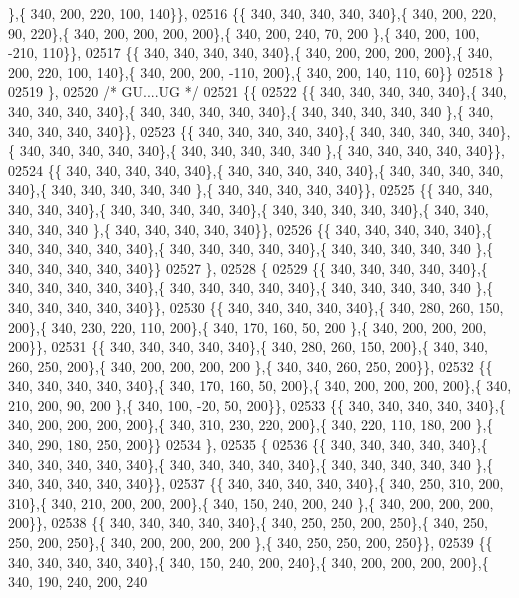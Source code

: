 \begin{DoxyCode}
      \},\{ 340, 200, 220, 100, 140\}\},
02516 \{\{ 340, 340, 340, 340, 340\},\{ 340, 200, 220,  90, 220\},\{ 340, 200, 200, 200, 200\},\{ 340, 200, 240,  70, 200
      \},\{ 340, 200, 100, -210, 110\}\},
02517 \{\{ 340, 340, 340, 340, 340\},\{ 340, 200, 200, 200, 200\},\{ 340, 200, 220, 100, 140\},\{ 340, 200, 200, -110, 
      200\},\{ 340, 200, 140, 110,  60\}\}
02518 \}
02519 \},
02520 \textcolor{comment}{/* GU....UG */}
02521 \{\{
02522 \{\{ 340, 340, 340, 340, 340\},\{ 340, 340, 340, 340, 340\},\{ 340, 340, 340, 340, 340\},\{ 340, 340, 340, 340, 340
      \},\{ 340, 340, 340, 340, 340\}\},
02523 \{\{ 340, 340, 340, 340, 340\},\{ 340, 340, 340, 340, 340\},\{ 340, 340, 340, 340, 340\},\{ 340, 340, 340, 340, 340
      \},\{ 340, 340, 340, 340, 340\}\},
02524 \{\{ 340, 340, 340, 340, 340\},\{ 340, 340, 340, 340, 340\},\{ 340, 340, 340, 340, 340\},\{ 340, 340, 340, 340, 340
      \},\{ 340, 340, 340, 340, 340\}\},
02525 \{\{ 340, 340, 340, 340, 340\},\{ 340, 340, 340, 340, 340\},\{ 340, 340, 340, 340, 340\},\{ 340, 340, 340, 340, 340
      \},\{ 340, 340, 340, 340, 340\}\},
02526 \{\{ 340, 340, 340, 340, 340\},\{ 340, 340, 340, 340, 340\},\{ 340, 340, 340, 340, 340\},\{ 340, 340, 340, 340, 340
      \},\{ 340, 340, 340, 340, 340\}\}
02527 \},
02528 \{
02529 \{\{ 340, 340, 340, 340, 340\},\{ 340, 340, 340, 340, 340\},\{ 340, 340, 340, 340, 340\},\{ 340, 340, 340, 340, 340
      \},\{ 340, 340, 340, 340, 340\}\},
02530 \{\{ 340, 340, 340, 340, 340\},\{ 340, 280, 260, 150, 200\},\{ 340, 230, 220, 110, 200\},\{ 340, 170, 160,  50, 200
      \},\{ 340, 200, 200, 200, 200\}\},
02531 \{\{ 340, 340, 340, 340, 340\},\{ 340, 280, 260, 150, 200\},\{ 340, 340, 260, 250, 200\},\{ 340, 200, 200, 200, 200
      \},\{ 340, 340, 260, 250, 200\}\},
02532 \{\{ 340, 340, 340, 340, 340\},\{ 340, 170, 160,  50, 200\},\{ 340, 200, 200, 200, 200\},\{ 340, 210, 200,  90, 200
      \},\{ 340, 100, -20,  50, 200\}\},
02533 \{\{ 340, 340, 340, 340, 340\},\{ 340, 200, 200, 200, 200\},\{ 340, 310, 230, 220, 200\},\{ 340, 220, 110, 180, 200
      \},\{ 340, 290, 180, 250, 200\}\}
02534 \},
02535 \{
02536 \{\{ 340, 340, 340, 340, 340\},\{ 340, 340, 340, 340, 340\},\{ 340, 340, 340, 340, 340\},\{ 340, 340, 340, 340, 340
      \},\{ 340, 340, 340, 340, 340\}\},
02537 \{\{ 340, 340, 340, 340, 340\},\{ 340, 250, 310, 200, 310\},\{ 340, 210, 200, 200, 200\},\{ 340, 150, 240, 200, 240
      \},\{ 340, 200, 200, 200, 200\}\},
02538 \{\{ 340, 340, 340, 340, 340\},\{ 340, 250, 250, 200, 250\},\{ 340, 250, 250, 200, 250\},\{ 340, 200, 200, 200, 200
      \},\{ 340, 250, 250, 200, 250\}\},
02539 \{\{ 340, 340, 340, 340, 340\},\{ 340, 150, 240, 200, 240\},\{ 340, 200, 200, 200, 200\},\{ 340, 190, 240, 200, 240

\end{DoxyCode}
